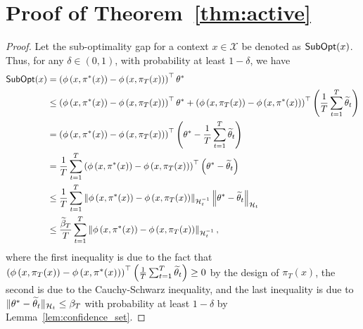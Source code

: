\section{Proof of Theorem~\ref{thm:active}} 
\begin{proof}
    Let the sub-optimality gap for a context $x \in \mathcal{X}$ be denoted as $\operatorname*{\mathsf{SubOpt}}(x)$. Thus, for any $\delta \in (0, 1)$, with probability at least $1-\delta$, we have
   \begin{align*}
    \operatorname*{\mathsf{SubOpt}}(x) & =\left(\phi\left(x, \pi^*(x)\right)-\phi\left(x, \pi_T(x)\right)\right)^{\top} \theta^* \\
  & \leq \left(\phi\left(x, \pi^*(x)\right)-\phi\left(x, \pi_T(x)\right)\right)^{\top} \theta^*+\left(\phi\left(x, \pi_T(x)\right)-\phi\left(x, \pi^*(x)\right)\right)^{\top}\left(\frac{1}{T} \sum_{t=1}^T \widetilde{\theta}_t\right) \\
  & =\left(\phi\left(x, \pi^*(x)\right)-\phi\left(x, \pi_T(x)\right)\right)^{\top}\left(\theta^*-\frac{1}{T} \sum_{t=1}^T \widetilde{\theta}_t\right) \\
  & =\frac{1}{T} \sum_{t=1}^T\left(\phi\left(x, \pi^*(x)\right)-\phi\left(x, \pi_T(x)\right)\right)^{\top}\left(\theta^*-\widetilde{\theta}_t\right) \\
  & \leq \frac{1}{T} \sum_{t=1}^T\left\|\phi\left(x, \pi^*(x)\right)-\phi\left(x, \pi_T(x)\right)\right\|_{\mathcal{H}_t^{-1}}\left\|\theta^*-\widetilde{\theta}_t\right\|_{\mathcal{H}_t}\\
  & \leq \frac{\widetilde{\beta}_T}{T} \sum_{t=1}^T\left\|\phi\left(x, \pi^*(x)\right)-\phi\left(x, \pi_T(x)\right)\right\|_{\mathcal{H}_t^{-1}},
   \end{align*}
   where the first inequality is due to the fact that $\left(\phi\left(x, \pi_T(x)\right)-\phi\left(x, \pi^*(x)\right)\right)^{\top}\left(\frac{1}{T} \sum_{t=1}^T \widetilde{\theta}_t\right)\geq 0$ by the design of $\pi_T(x)$, the second is due to the Cauchy-Schwarz inequality, and the last inequality is due to $\|\theta^*-\widetilde{\theta}_t\|_{\mathcal{H}_t} \leq \beta_T$ with probability at least $1-\delta$ by Lemma~\ref{lem:confidence_set}.


\end{proof}
